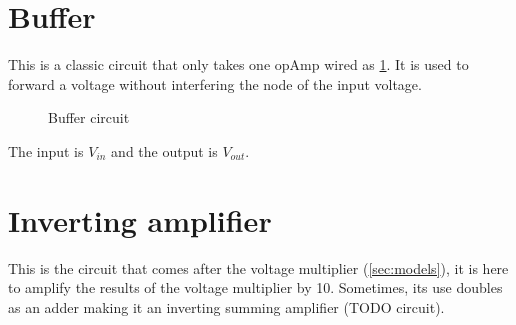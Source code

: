 \label{ap:circuit}

\section{Buffer}\label{apsec:buffer}

This is a classic circuit that only takes one \ac{opAmp} wired as \cref{fig:buffer}. It is used to forward a voltage without interfering the node of the input voltage.

\begin{figure}[H]
\centering

\caption{Buffer circuit}
\label{fig:buffer}
\end{figure}

The input is $V_{in}$ and the output is $V_{out}$.

\section{Inverting amplifier}\label{apsec:invAmp}

This is the circuit that comes after the voltage multiplier (\cref{sec:models}), it is here to amplify the results of the voltage multiplier by 10. Sometimes, its use doubles as an adder making it an inverting summing amplifier (TODO circuit).

